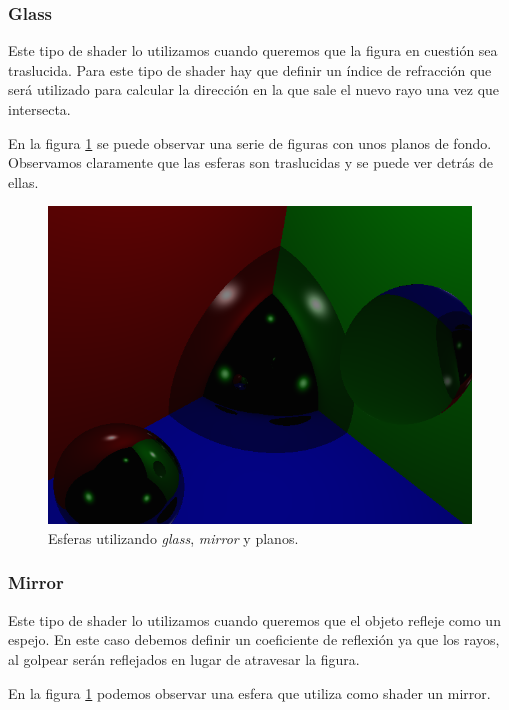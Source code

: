 \documentclass[a4paper,10pt]{article}
\begin{document}
\subsubsection{Glass}

Este tipo de shader lo utilizamos cuando queremos que la figura en cuesti\'on
sea traslucida.  Para este tipo de shader hay que definir un \'indice de
refracci\'on que ser\'a utilizado para calcular la direcci\'on en la que sale el
nuevo rayo una vez que intersecta.

En la figura \ref{fig:figure12} se puede observar una serie de figuras con unos
planos de fondo.  Observamos claramente que las esferas son traslucidas y se
puede ver detr\'as de ellas.

\begin{figure}[ht]
\centering
\includegraphics[scale=0.50]{scene4.png}
\caption{Esferas utilizando \emph{glass}, \emph{mirror} y planos.}
\label{fig:figure12}
\end{figure}

\subsubsection{Mirror}

Este tipo de shader lo utilizamos cuando queremos que el objeto refleje como un
espejo.  En este caso debemos definir un coeficiente de reflexi\'on ya que los
rayos, al golpear ser\'an reflejados en lugar de atravesar la figura.

En la figura \ref{fig:figure12} podemos observar una esfera que utiliza como
shader un mirror.
\end{document}
